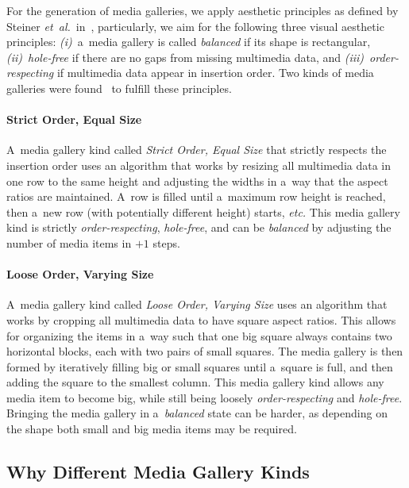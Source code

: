 \documentclass{sig-alternate}
\begin{document}
For the generation of media galleries, we apply aesthetic principles
as defined by Steiner \emph{et~al.}\
in~\cite{steiner2013tocrop,steiner2012aesthetic},
particularly, we aim for the following
three visual aesthetic principles:
\emph{(i)}~a~media gallery is called \emph{balanced}
if its shape is rectangular,
\emph{(ii)}~\emph{hole-free}
if there are no gaps from missing multimedia data,
and \emph{(iii)}~\emph{order-respecting}
if multimedia data appear in insertion order.
Two kinds of media galleries were found~\cite{steiner2013tocrop}
to fulfill these principles.

\paragraph{Strict Order, Equal Size}

A~media gallery kind called \emph{Strict Order, Equal Size}
that strictly respects the insertion order
uses an algorithm that works by resizing all multimedia data
in one row to the same height and adjusting the widths
in a~way that the aspect ratios are maintained.
A~row is filled until a~maximum row height is reached,
then a~new row (with potentially different height) starts, \emph{etc.}
This media gallery kind is strictly \emph{order-respecting},
\emph{hole-free}, and can be \emph{balanced}
by adjusting the number of media items in $+1$ steps.

\paragraph{Loose Order, Varying Size}

A~media gallery kind called \emph{Loose Order, Varying Size}
uses an algorithm that works by cropping all multimedia data
to have square aspect ratios.
This allows for organizing the items in a~way such that one big square
always contains two horizontal blocks,
each with two pairs of small squares.
The media gallery is then formed by iteratively filling
big or small squares until a~square is full,
and then adding the square to the smallest column.
This media gallery kind allows any media item to become big,
while still being loosely \emph{order-respecting} and \emph{hole-free}.
Bringing the media gallery in a~\emph{balanced} state can be harder,
as depending on the shape both small and big
media items may be required.

\subsection{Why Different Media Gallery Kinds}
\end{document}
